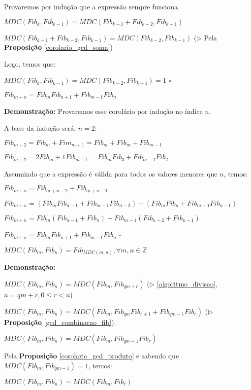 Provaremos por indução que a expressão sempre funciona.

$MDC(Fib_{k}, Fib_{k-1}) = MDC(Fib_{k-1} + Fib_{k-2}, Fib_{k-1})$

$MDC(Fib_{k-1} + Fib_{k-2}, Fib_{k-1}) = MDC(Fib_{k-2}, Fib_{k-1})$ ($\triangleright$ Pela \textbf{Proposição} \autoref{corolario_gcd_soma})

Logo, temos que:

$MDC(Fib_{k}, Fib_{k-1}) = MDC(Fib_{k-2}, Fib_{k-1}) = 1$ $\square$



\begin{proposition}\label{gcd_combinacao_fib}
$Fib_{m+n} = Fib_mFib_{n+1} + Fib_{m-1}Fib_n$
\end{proposition}
\textbf{Demonstração:} Provaremos esse corolário por indução no índice $n$.

A base da indução será, $n=2$:

$Fib_{m+2} = Fib_m + Fim_{m+1} = Fib_m + Fib_m + Fib_{m-1}$

$Fib_{m+2} = 2Fib_m + 1Fib_{m-1} = Fib_mFib_{3} + Fib_{m-1}Fib_2$

Assumindo que a expressão é válida para todos os valores menores que $n$, temos:

$Fib_{m+n} = Fib_{m+n-2} + Fib_{m+n-1}$

$Fib_{m+n} = (Fib_{m}Fib_{n-1} + Fib_{m-1}Fib_{n-2}) + (Fib_{m}Fib_{n} + Fib_{m-1}Fib_{n-1})$

$Fib_{m+n} = Fib_m(Fib_{n-1} + Fib_{n}) + Fib_{m-1}(Fib_{n-2} + Fib_{n-1})$

$Fib_{m+n} = Fib_mFib_{n+1} + Fib_{m-1}Fib_n$ $\square$ 


\begin{theorem}\label{fibonacci_mdc}
$MDC(Fib_m, Fib_n) = Fib_{MDC(m, n)}, \forall m, n \in \mathbb{Z}$
\end{theorem}
\textbf{Demonstração:}

$MDC(Fib_m, Fib_n) = MDC(Fib_m, Fib_{qm + r})$ ($\triangleright$ \autoref{algoritmo_divisao}, $n = qm + r, 0 \leq r < n$)

$MDC(Fib_m, Fib_n) = MDC(Fib_m, Fib_{qm}Fib_{r+1} + Fib_{qm-1}Fib_{r})$ ($\triangleright$ \textbf{Proposição} \autoref{gcd_combinacao_fib}).

$MDC(Fib_m, Fib_n) = MDC(Fib_m, Fib_{qm-1}Fib_{r})$

Pela \textbf{Proposição} \autoref{corolario_gcd_produto} e sabendo que $MDC(Fib_m,Fib_{qm-1})=1$, temos:

$MDC(Fib_m, Fib_n) = MDC(Fib_m, Fib_{r})$

